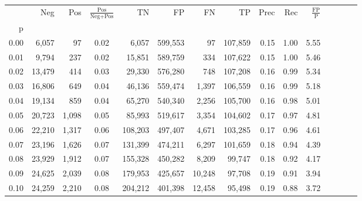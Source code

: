 \begin{tabular}{rrrcrrrrrrrrrrr}
\toprule
{} &     Neg &    Pos & $\frac{\text{Pos}}{\text{Neg}+\text{Pos}}$ &       TN &       FP &       FN &       TP &  Prec &   Rec & $\frac{\text{FP}}{\text{P}}$ \\
p    &         &        &                                            &          &          &          &          &       &       &                              \\
\midrule
0.00 &   6,057 &     97 &                                       0.02 &    6,057 &  599,553 &       97 &  107,859 &  0.15 &  1.00 &                         5.55 \\
0.01 &   9,794 &    237 &                                       0.02 &   15,851 &  589,759 &      334 &  107,622 &  0.15 &  1.00 &                         5.46 \\
0.02 &  13,479 &    414 &                                       0.03 &   29,330 &  576,280 &      748 &  107,208 &  0.16 &  0.99 &                         5.34 \\
0.03 &  16,806 &    649 &                                       0.04 &   46,136 &  559,474 &    1,397 &  106,559 &  0.16 &  0.99 &                         5.18 \\
0.04 &  19,134 &    859 &                                       0.04 &   65,270 &  540,340 &    2,256 &  105,700 &  0.16 &  0.98 &                         5.01 \\
0.05 &  20,723 &  1,098 &                                       0.05 &   85,993 &  519,617 &    3,354 &  104,602 &  0.17 &  0.97 &                         4.81 \\
0.06 &  22,210 &  1,317 &                                       0.06 &  108,203 &  497,407 &    4,671 &  103,285 &  0.17 &  0.96 &                         4.61 \\
0.07 &  23,196 &  1,626 &                                       0.07 &  131,399 &  474,211 &    6,297 &  101,659 &  0.18 &  0.94 &                         4.39 \\
0.08 &  23,929 &  1,912 &                                       0.07 &  155,328 &  450,282 &    8,209 &   99,747 &  0.18 &  0.92 &                         4.17 \\
0.09 &  24,625 &  2,039 &                                       0.08 &  179,953 &  425,657 &   10,248 &   97,708 &  0.19 &  0.91 &                         3.94 \\
0.10 &  24,259 &  2,210 &                                       0.08 &  204,212 &  401,398 &   12,458 &   95,498 &  0.19 &  0.88 &                         3.72 \\

\end{tabular}
